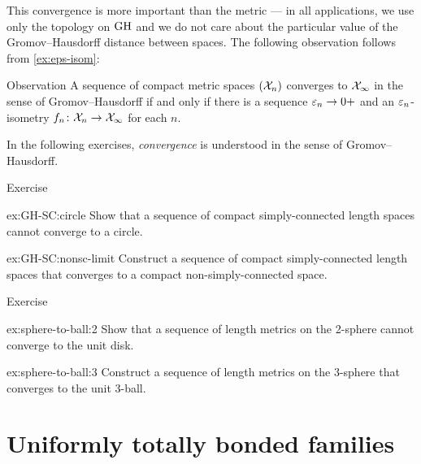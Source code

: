 This convergence is more important than the metric ---
in all applications, we use only the topology on $\operatorname{\rm GH}\nolimits$
and we do not care about the particular value of the Gromov--Hausdorff distance between spaces.
The following observation follows from \ref{ex:eps-isom}:

\begin{thm}{Observation}\label{obs:GH-e-isom}
A sequence of compact metric spaces $(\mathcal{X}_n)$ converges to  $\mathcal{X}_\infty$ in the sense of Gromov--Hausdorff if and only if there is a sequence $\varepsilon_n\to0+$
and an $\varepsilon_n$-isometry $f_n\colon\mathcal{X}_n\to \mathcal{X}_\infty$ for each $n$.
\end{thm}

In the following exercises, \textit{convergence} is understood in the sense of Gromov--Hausdorff.

\begin{thm}{Exercise}\label{ex:GH-SC}
\begin{subthm}{ex:GH-SC:circle}
Show that a sequence of compact simply-connected length spaces cannot converge to a circle.
\end{subthm}

\begin{subthm}{ex:GH-SC:nonsc-limit}
Construct a sequence of compact simply-connected length spaces that converges to a compact non-simply-connected space.
\end{subthm}
\end{thm}

\begin{thm}{Exercise}\label{ex:sphere-to-ball}
\begin{subthm}{ex:sphere-to-ball:2}
Show that a sequence of length metrics on the 2-sphere cannot converge to the unit disk.
\end{subthm}

\begin{subthm}{ex:sphere-to-ball:3}
Construct a sequence of length metrics on the 3-sphere that converges to the unit 3-ball.
\end{subthm}

\end{thm}

\section{Uniformly totally bonded families}

